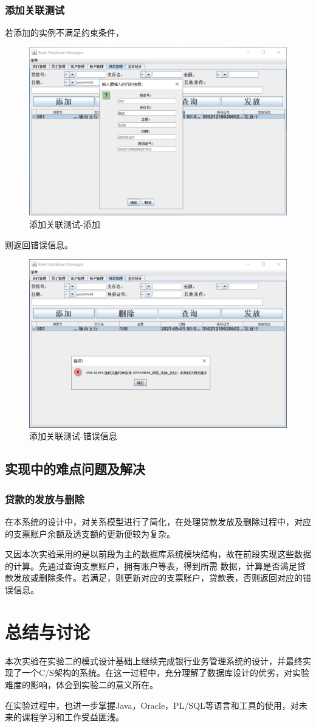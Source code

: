 \documentclass{ctexart}
\begin{document}
\subsubsection{\hei 添加关联测试}
若添加的实例不满足约束条件，
\begin{figure}[H]
    \centering
    \includegraphics[scale=0.2]{tianj.png}
    \caption{添加关联测试-添加}
\end{figure}
\par 则返回错误信息。
\begin{figure}[H]
    \centering
    \includegraphics[scale=0.2]{tianj2.png}
    \caption{添加关联测试-错误信息}
\end{figure}
\subsection{\hei 实现中的难点问题及解决}
\subsubsection{\hei 贷款的发放与删除}
在本系统的设计中，对关系模型进行了简化，在处理贷款发放及删除过程中，对应的支票账户余额及透支额的更新便较为复杂。
\par 
又因本次实验采用的是以前段为主的数据库系统模块结构，故在前段实现这些数据的计算。先通过查询支票账户，拥有账户等表，得到所需
数据，计算是否满足贷款发放或删除条件。若满足，则更新对应的支票账户，贷款表，否则返回对应的错误信息。
\section{\hei 总结与讨论}
本次实验在实验二的模式设计基础上继续完成银行业务管理系统的设计，并最终实现了一个C/S架构的系统。在这一过程中，充分理解了数据库设计的优劣，对实验难度的影响，体会到实验二的意义所在。
\par 在实验过程中，也进一步掌握Java，Oracle，PL/SQL等语言和工具的使用，对未来的课程学习和工作受益匪浅。
\end{document}
